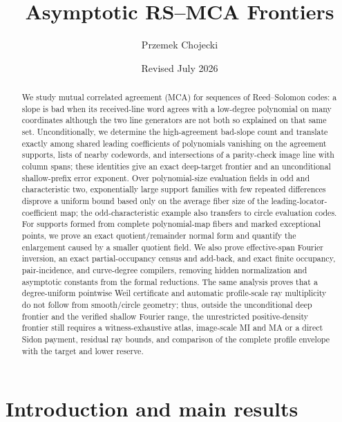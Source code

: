\documentclass[12pt,a4paper]{amsart}
\title{Asymptotic RS--MCA Frontiers}
\author{Przemek Chojecki}
\date{Revised July 2026}
\numberwithin{equation}{section}
\theoremstyle{remark}
\begin{document}
\begin{abstract}
We study mutual correlated agreement (MCA) for sequences of Reed--Solomon
codes: a slope is bad when its received-line word agrees with a low-degree
polynomial on many coordinates although the two line generators are not
both so explained on that same set.  Unconditionally, we determine the
high-agreement bad-slope count and translate exactly among shared leading
coefficients of polynomials vanishing on the agreement supports, lists of
nearby codewords, and intersections of a parity-check image line with
column spans; these identities give an exact deep-target frontier and an
unconditional shallow-prefix error exponent.  Over polynomial-size evaluation
fields in odd and characteristic two, exponentially large support families
with few repeated differences disprove a uniform bound based only on the
average fiber size of the leading-locator-coefficient map; the
odd-characteristic example also transfers to circle evaluation codes.  For
supports formed from complete polynomial-map
fibers and marked exceptional points, we prove an exact quotient/remainder
normal form and quantify the enlargement caused by a smaller quotient
field.  We also prove effective-span Fourier inversion, an exact
partial-occupancy census and add-back, and exact finite
occupancy, pair-incidence, and curve-degree compilers, removing hidden
normalization and asymptotic constants from the formal reductions.  The
same analysis proves that a degree-uniform pointwise Weil certificate and
automatic profile-scale ray multiplicity do not follow from smooth/circle
geometry; thus, outside the unconditional deep frontier and the verified
shallow Fourier range, the unrestricted positive-density frontier still
requires a witness-exhaustive atlas, image-scale MI and MA or a direct
Sidon payment, residual ray bounds, and comparison of the complete profile
envelope with the target and lower reserve.
\end{abstract}

\maketitle

\section{Introduction and main results}\label{sec:introduction}
\end{document}

